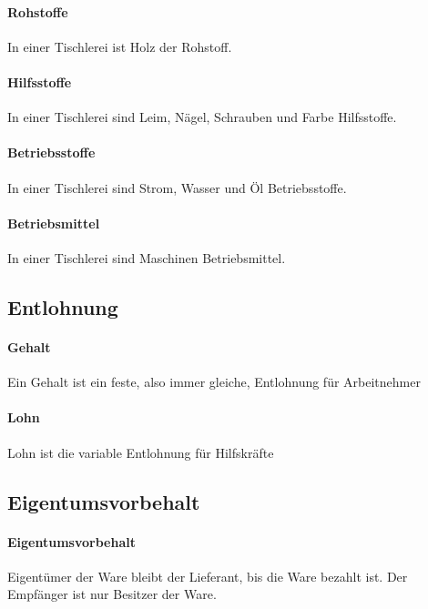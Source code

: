 \documentclass[../main.tex]{subfiles}
\begin{document}
            \paragraph{Rohstoffe}
                In einer Tischlerei ist Holz der Rohstoff.
                
            \paragraph{Hilfsstoffe}
                In einer Tischlerei sind Leim, Nägel, Schrauben und Farbe Hilfsstoffe.
                
            \paragraph{Betriebsstoffe}
                In einer Tischlerei sind Strom, Wasser und Öl Betriebsstoffe.
                
            \paragraph{Betriebsmittel}
                In einer Tischlerei sind Maschinen Betriebsmittel.

        \subsection{Entlohnung}            
            \paragraph{Gehalt}
                Ein Gehalt ist ein feste, also immer gleiche, Entlohnung für Arbeitnehmer
                
            \paragraph{Lohn}
                Lohn ist die variable Entlohnung für Hilfskräfte
                
        \subsection{Eigentumsvorbehalt}
            \paragraph{Eigentumsvorbehalt}
                Eigentümer der Ware bleibt der Lieferant, bis die Ware bezahlt ist. Der Empfänger ist nur Besitzer der Ware.
            
\end{document}

